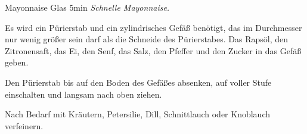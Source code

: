 \documentclass[../recipe-collections/cooking.tex]{subfiles}
\begin{document}
\begin{recipe}{Mayonnaise}{ Glas }{5min }
  \freeform{}\textit{Schnelle Mayonnaise.}


  Es wird ein Pürierstab und ein zylindrisches Gefäß benötigt, das im Durchmesser nur wenig größer sein darf als die Schneide des Pürierstabes.
  Das Rapsöl, den Zitronensaft, das Ei, den Senf, das Salz, den Pfeffer und den Zucker in das Gefäß geben.

  \newstep{}Den Pürierstab bis auf den Boden des Gefäßes absenken, auf voller Stufe einschalten und langsam nach oben ziehen.

  \newstep{}Nach Bedarf mit Kräutern, Petersilie, Dill, Schnittlauch oder Knoblauch verfeinern.

  \freeform{}\hrulefill{}

\end{recipe}
\end{document}
